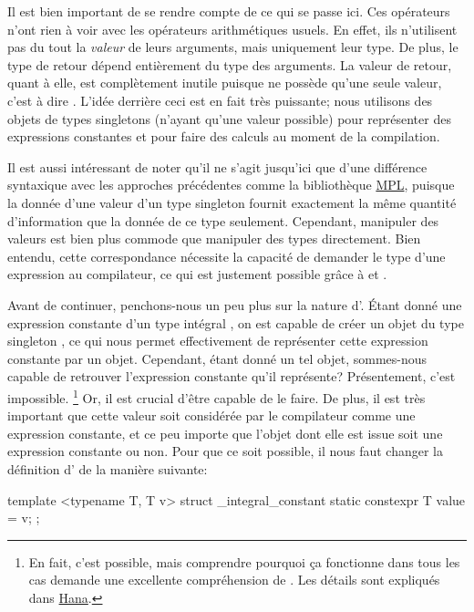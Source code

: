 Il est bien important de se rendre compte de ce qui se passe ici. Ces opérateurs
n'ont rien à voir avec les opérateurs arithmétiques usuels. En effet, ils
n'utilisent pas du tout la \textit{valeur} de leurs arguments, mais uniquement
leur type. De plus, le type de retour dépend entièrement du type des arguments.
La valeur de retour, quant à elle, est complètement inutile puisque
 ne possède qu'une seule valeur, c'est à dire
. L'idée derrière ceci est en fait très
puissante; nous utilisons des objets de types singletons (n'ayant qu'une
valeur possible) pour représenter des expressions constantes et pour faire
des calculs au moment de la compilation.

Il est aussi intéressant de noter qu'il ne s'agit jusqu'ici que d'une différence
syntaxique avec les approches précédentes comme la bibliothèque \href{\MPL}{MPL},
puisque la donnée d'une valeur d'un type singleton fournit exactement la même
quantité d'information que la donnée de ce type seulement. Cependant, manipuler
des valeurs est bien plus commode que manipuler des types directement. Bien
entendu, cette correspondance nécessite la capacité de demander le type d'une
expression au compilateur, ce qui est justement possible grâce à 
et .

Avant de continuer, penchons-nous un peu plus sur la nature d'.
Étant donné une expression constante  d'un type intégral , on est
capable de créer un objet du type singleton , ce qui
nous permet effectivement de représenter cette expression constante par un objet.
Cependant, étant donné un tel objet, sommes-nous capable de retrouver l'expression
constante qu'il représente? Présentement, c'est impossible.
\footnote{
    En fait, c'est possible, mais comprendre pourquoi ça fonctionne dans tous
    les cas demande une excellente compréhension de . Les
    détails sont expliqués dans \href{\Hana}{Hana}.
}
Or, il est crucial d'être capable de le faire. De plus, il est très important
que cette valeur soit considérée par le compilateur comme une expression constante,
et ce peu importe que l'objet dont elle est issue soit une expression constante ou
non. Pour que ce soit possible, il nous faut changer la définition
d' de la manière suivante:
\begin{cpp}
    template <typename T, T v>
    struct _integral_constant {
        static constexpr T value = v;
    };
\end{cpp}

